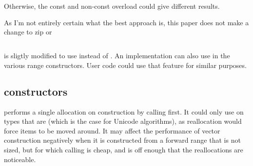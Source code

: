 \documentclass{wg21}
\begin{document}
Otherwise, the const and non-const overload could give different results.

As I'm not entirely certain what the best approach is, this paper does not make a change to zip or 

\subsection{}

 is sligtly modified to use  instead of .
An implementation can also use  in the various range constructors.
User code could use that feature for similar purposes.


\subsection{ constructors}

 performs a single allocation on construction by calling  first.
It could only use  on types that are  (which is the case for Unicode algorithms), as reallocation would force items to be moved around.
It may affect the performance of vector construction negatively when it is constructed from a forward range that is not sized, but for which calling  is cheap, and  is off enough that the reallocations are noticeable.
\end{document}
